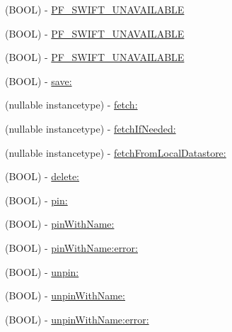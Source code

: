 \begin{DoxyCompactItemize}
\begin{DoxyCompactList}
 \end{DoxyCompactList}\item 
(B\+O\+O\+L) -\/ \hyperlink{interface_p_f_object_adbd353cd498462b7749c7a2ad0d745d0}{P\+F\+\_\+\+S\+W\+I\+F\+T\+\_\+\+U\+N\+A\+V\+A\+I\+L\+A\+B\+L\+E}
\begin{DoxyCompactList}\small\item\em 

 \end{DoxyCompactList}\item 
(B\+O\+O\+L) -\/ \hyperlink{interface_p_f_object_adbd353cd498462b7749c7a2ad0d745d0}{P\+F\+\_\+\+S\+W\+I\+F\+T\+\_\+\+U\+N\+A\+V\+A\+I\+L\+A\+B\+L\+E}
\begin{DoxyCompactList}\small\item\em 

 \end{DoxyCompactList}\item 
(B\+O\+O\+L) -\/ \hyperlink{interface_p_f_object_adbd353cd498462b7749c7a2ad0d745d0}{P\+F\+\_\+\+S\+W\+I\+F\+T\+\_\+\+U\+N\+A\+V\+A\+I\+L\+A\+B\+L\+E}
\begin{DoxyCompactList}\small\item\em 

 \end{DoxyCompactList}\item 
(B\+O\+O\+L) -\/ \hyperlink{interface_p_f_object_a1d376c0415a13a0785ebe6a119ed3324}{save\+:}
\item 
(nullable instancetype) -\/ \hyperlink{interface_p_f_object_a22919482d9b99ba9787f0f5144484099}{fetch\+:}
\item 
(nullable instancetype) -\/ \hyperlink{interface_p_f_object_a41bf492b240772ee98a8f6b2728101a8}{fetch\+If\+Needed\+:}
\item 
(nullable instancetype) -\/ \hyperlink{interface_p_f_object_a6e07bdad46a1242e0ca21bc8c864b074}{fetch\+From\+Local\+Datastore\+:}
\item 
(B\+O\+O\+L) -\/ \hyperlink{interface_p_f_object_a275e27c04d747f626dabcb618298e149}{delete\+:}
\item 
(B\+O\+O\+L) -\/ \hyperlink{interface_p_f_object_a0ed73b08b70ced7cedc6b8c2993d1937}{pin\+:}
\item 
(B\+O\+O\+L) -\/ \hyperlink{interface_p_f_object_a25909ad50643cdb1d6558dbe04fb1a7d}{pin\+With\+Name\+:}
\item 
(B\+O\+O\+L) -\/ \hyperlink{interface_p_f_object_a99b147c524b8e00861636660c5b00db1}{pin\+With\+Name\+:error\+:}
\item 
(B\+O\+O\+L) -\/ \hyperlink{interface_p_f_object_a25de4ace661e9634ef79586b5207c874}{unpin\+:}
\item 
(B\+O\+O\+L) -\/ \hyperlink{interface_p_f_object_aa58a44ec55fc92a6e206c894795c59e9}{unpin\+With\+Name\+:}
\item 
(B\+O\+O\+L) -\/ \hyperlink{interface_p_f_object_afaada7851ee75c8d64599c682415bc05}{unpin\+With\+Name\+:error\+:}
\end{DoxyCompactItemize}
